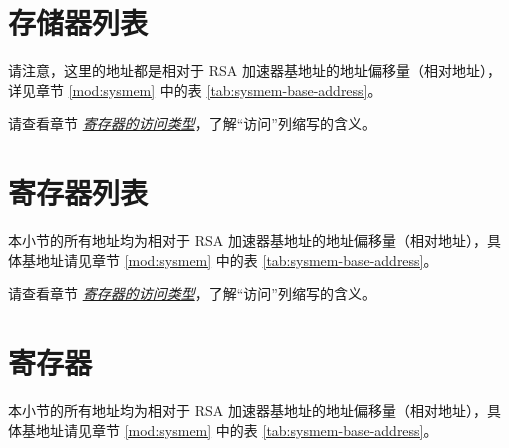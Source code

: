 \documentclass[main\_\_CN.tex]{subfiles}
\begin{document}
\section{存储器列表 }\label{sec:mem-sum}
请注意，这里的地址都是相对于 RSA 加速器基地址的地址偏移量（相对地址），详见章节 \ref{mod:sysmem} \textit{} 中的表 \ref{tab:sysmem-base-address}。 

请查看章节 \hyperref[glossary-access-types]{\textit{寄存器的访问类型}}，了解“访问”列缩写的含义。




\hypertarget{rsa-reg-summ}{}
\section{寄存器列表}
\label{sec:rsa-reg-summ}
本小节的所有地址均为相对于 RSA 加速器基地址的地址偏移量（相对地址），具体基地址请见章节 \ref{mod:sysmem} \textit{} 中的表 \ref{tab:sysmem-base-address}。

请查看章节 \hyperref[glossary-access-types]{\textit{寄存器的访问类型}}，了解“访问”列缩写的含义。





\clearpage
\section{寄存器}

本小节的所有地址均为相对于 RSA 加速器基地址的地址偏移量（相对地址），具体基地址请见章节 \ref{mod:sysmem} \textit{} 中的表 \ref{tab:sysmem-base-address}。


\end{document}
